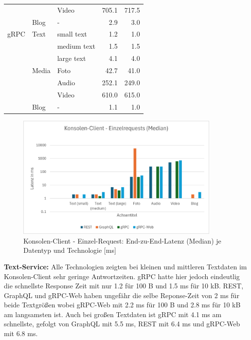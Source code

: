 \begin{table}[h]
\begin{tabular}{|l|l|l|r|r|}
		&       & Video       & 705.1 & 717.5 \\
		& Blog  & -           & 2.9 & 3.0 \\
		\hline
		gRPC & Text  & small text  & 1.2 & 1.0 \\
		&       & medium text & 1.5 & 1.5 \\
		&       & large text  & 4.1 & 4.0 \\
		& Media & Foto        & 42.7 & 41.0 \\
		&       & Audio       & 252.1 & 249.0 \\
		&       & Video       & 610.0 & 615.0 \\
		& Blog  & -           & 1.1 & 1.0 \\
		\hline
	\end{tabular}
\end{table}

\clearpage

\begin{figure}[htbp]
	\centering
	\includegraphics[width=0.9\textwidth]{images/Konsolenclient.png}
	\caption{Konsolen-Client - Einzel-Request: End-zu-End-Latenz (Median) je Datentyp und Technologie [ms]}
	\label{fig:console-client-1req}
\end{figure}

\textbf{Text-Service:}  
Alle Technologien zeigten bei kleinen und mittleren Textdaten im Konsolen-Client sehr geringe Antwortzeiten. gRPC hatte hier jedoch eindeutlig die schnellste Response Zeit mit nur 1.2 für 100 B und 1.5 ms für 10 kB. REST, GraphQL und gRPC-Web haben ungefähr die selbe Reponse-Zeit von 2 ms für beide Textgrößen wobei gRPC-Web mit 2.2 ms für 100 B und 2.8 ms für 10 kB am langsamsten ist.
Auch bei großen Textdaten ist gRPC mit 4.1 ms am schnellste, gefolgt von GraphQL mit 5.5 ms, REST mit 6.4 ms und gRPC-Web mit 6.8 ms.


